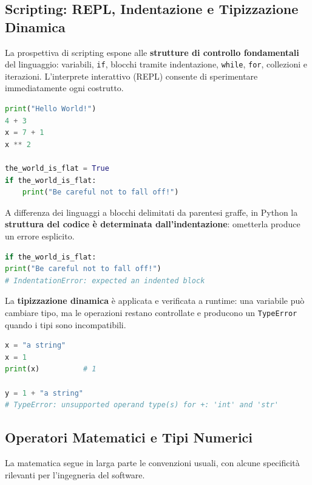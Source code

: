 \documentclass[12pt]{extarticle}
\begin{document}
\subsection{Scripting: REPL, Indentazione e Tipizzazione Dinamica}

\noindent La prospettiva di scripting espone alle \textbf{strutture di controllo fondamentali} del linguaggio: variabili, \texttt{if}, blocchi tramite indentazione, \texttt{while}, \texttt{for}, collezioni e iterazioni. L'interprete interattivo (REPL) consente di sperimentare immediatamente ogni costrutto.

\begin{lstlisting}[language=Python]
print("Hello World!")
4 + 3
x = 7 + 1
x ** 2

the_world_is_flat = True
if the_world_is_flat:
    print("Be careful not to fall off!")
\end{lstlisting}

\noindent A differenza dei linguaggi a blocchi delimitati da parentesi graffe, in Python la \textbf{struttura del codice è determinata dall'indentazione}: ometterla produce un errore esplicito.

\begin{lstlisting}[language=Python]
if the_world_is_flat:
print("Be careful not to fall off!")
# IndentationError: expected an indented block
\end{lstlisting}

\noindent La \textbf{tipizzazione dinamica} è applicata e verificata a runtime: una variabile può cambiare tipo, ma le operazioni restano controllate e producono un \texttt{TypeError} quando i tipi sono incompatibili.

\begin{lstlisting}[language=Python]
x = "a string"
x = 1
print(x)          # 1

y = 1 + "a string"
# TypeError: unsupported operand type(s) for +: 'int' and 'str'
\end{lstlisting}

\subsection{Operatori Matematici e Tipi Numerici}

\noindent La matematica segue in larga parte le convenzioni usuali, con alcune specificità rilevanti per l'ingegneria del software.
\end{document}
